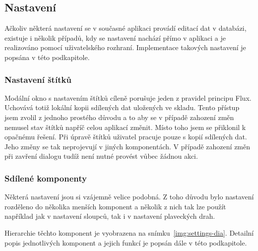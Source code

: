 \subsection{Nastavení}
Ačkoliv některá nastavení se v současné aplikaci provádí editací dat v databázi, existuje i několik případů, kdy se nastavení nachází přímo v aplikaci a je realizováno pomocí uživatelského rozhraní. Implementace takových nastavení je popsána v této podkapitole.

\subsubsection*{Nastavení štítků}
Modální okno s nastavením štítků cíleně porušuje jeden z pravidel principu Flux. Uchovává totiž lokální kopii sdílených dat uložených ve skladu. Tento přístup jsem zvolil z jednoho prostého důvodu a to aby se v případě zahození změn nemusel stav štítků napříč celou aplikací změnit. Místo toho jsem se přiklonil k opačnému řešení. Při úpravě štítků uživatel pracuje pouze s kopií sdílených dat. Jeho změny se tak neprojevují v jiných komponentách. V případě zahození změn při zavření dialogu tudíž není nutné provést vůbec žádnou akci. 

\subsubsection*{Sdílené komponenty}
Některá nastavení jsou si vzájemně velice podobná. Z toho důvodu bylo nastavení rozděleno do několika menších komponent a několik z nich tak lze použít například jak v nastavení sloupců, tak i v nastavení plaveckých drah.

Hierarchie těchto komponent je vyobrazena na snímku~\ref{img:settings-dia}. Detailní popis jednotlivých komponent a jejich funkcí je popsán dále v této podkapitole.

